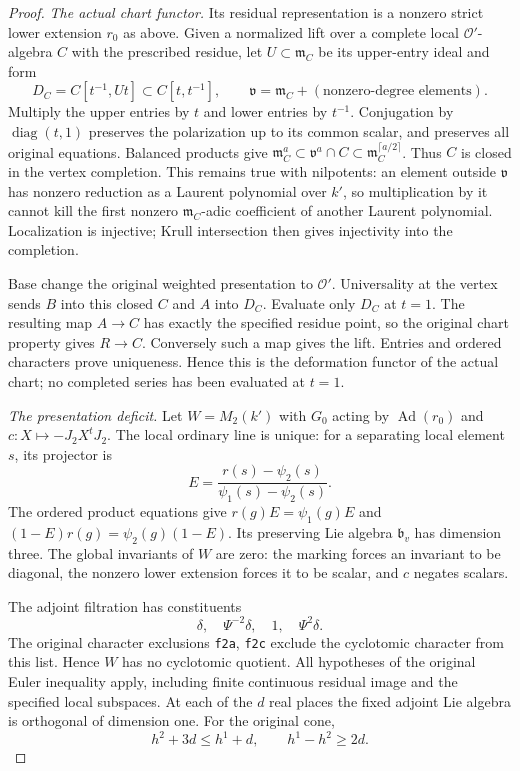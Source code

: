 \begin{proof}
\emph{The actual chart functor.}
Its residual representation is a nonzero strict lower extension
$r_0$ as above.  Given a normalized lift over a complete local
$\mathcal O'$-algebra $C$ with the prescribed residue, let
$U\subset\mathfrak m_C$ be its upper-entry ideal and form
\begin{equation}\label{eq:ranktwo-laurent-rees}
 D_C=C[t^{-1},Ut]\subset C[t,t^{-1}],\qquad
 \mathfrak v=\mathfrak m_C+(\text{nonzero-degree elements}).
\end{equation}
Multiply the upper entries by $t$ and lower entries by $t^{-1}$.
Conjugation by $\operatorname{diag}(t,1)$ preserves the polarization
up to its common scalar, and preserves all original equations.
Balanced products give
$\mathfrak m_C^a\subset\mathfrak v^a\cap C
\subset\mathfrak m_C^{\lceil a/2\rceil}$.
Thus $C$ is closed in the vertex completion.  This remains true with
nilpotents: an element outside $\mathfrak v$ has nonzero reduction
as a Laurent polynomial over $k'$, so multiplication by it cannot
kill the first nonzero $\mathfrak m_C$-adic coefficient of another
Laurent polynomial.  Localization is injective; Krull intersection
then gives injectivity into the completion.

Base change the original weighted presentation to $\mathcal O'$.
Universality at the vertex sends $B$ into this closed $C$ and $A$
into $D_C$.  Evaluate only $D_C$ at $t=1$.  The resulting map
$A\to C$ has exactly the specified residue point, so the original
chart property gives $R\to C$.  Conversely such a map gives the
lift.  Entries and ordered characters prove uniqueness.  Hence this
is the deformation functor of the actual chart; no completed series
has been evaluated at $t=1$.

\emph{The presentation deficit.}
Let $W=M_2(k')$ with $G_0$ acting by $\operatorname{Ad}(r_0)$ and
$c:X\mapsto-J_2X^tJ_2$.  The local ordinary line is unique:
for a separating local element $s$, its projector is
\[
             E=\frac{r(s)-\psi_2(s)}{\psi_1(s)-\psi_2(s)}.
\]
The ordered product equations give
$r(g)E=\psi_1(g)E$ and
$(1-E)r(g)=\psi_2(g)(1-E)$.
Its preserving Lie algebra $\mathfrak b_v$ has dimension three.
The global invariants of $W$ are zero: the marking forces an
invariant to be diagonal, the nonzero lower extension forces it
to be scalar, and $c$ negates scalars.

The adjoint filtration has constituents
\[
                 \delta,\quad\Psi^{-2}\delta,\quad1,
                 \quad\Psi^2\delta.
\]
The original character exclusions \texttt{f2a}, \texttt{f2c} exclude
the cyclotomic character from this list.  Hence $W$ has no cyclotomic
quotient.  All hypotheses of the original Euler inequality apply,
including finite continuous residual image and the specified local
subspaces.  At each of the $d$ real places the fixed adjoint Lie
algebra is orthogonal of dimension one.  For the original cone,
\begin{equation}\label{eq:ranktwo-euler-deficit}
        h^2+3d\le h^1+d,\qquad h^1-h^2\ge2d.
\end{equation}


\end{proof}
